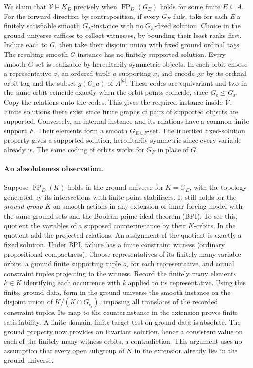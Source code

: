 \documentclass[11pt]{article}
\newcommand{\FP}{\operatorname{FP}}
\begin{document}
We claim that $\mathcal V\models K_D$ precisely when $\FP_D(G_E)$ holds for some finite $E\subseteq A$. For the forward direction by contraposition, if every $G_E$ fails, take for each $E$ a finitely satisfiable smooth $G_E$-instance with no $G_E$-fixed solution. Choice in the ground universe suffices to collect witnesses, by bounding their least ranks first. Induce each to $G$, then take their disjoint union with fixed ground ordinal tags. The resulting smooth $G$-instance has no finitely supported solution. Every smooth $G$-set is realizable by hereditarily symmetric objects. In each orbit choose a representative $x$, an ordered tuple $a$ supporting $x$, and encode $gx$ by its ordinal orbit tag and the subset $g(G_x a)$ of $A^{|a|}$. These codes are equivariant and two in the same orbit coincide exactly when the orbit points coincide, since $G_a\leq G_x$. Copy the relations onto the codes. This gives the required instance inside $\mathcal V$. Finite solutions there exist since finite graphs of pairs of supported objects are supported. Conversely, an internal instance and its relations have a common finite support $F$. Their elements form a smooth $G_{E\cup F}$-set. The inherited fixed-solution property gives a supported solution, hereditarily symmetric since every variable already is. The same coding of orbits works for $G_F$ in place of $G$.

\paragraph{An absoluteness observation.}
Suppose $\FP_D(K)$ holds in the ground universe for $K=G_E$, with the topology generated by its intersections with finite point stabilizers. It still holds for the \emph{ground group} $K$ on smooth actions in any extension or inner forcing model with the same ground sets and the Boolean prime ideal theorem (BPI). To see this, quotient the variables of a supposed counterinstance by their $K$-orbits. In the quotient add the projected relations. An assignment of the quotient is exactly a fixed solution. Under BPI, failure has a finite constraint witness (ordinary propositional compactness). Choose representatives of its finitely many variable orbits, a ground finite supporting tuple $a_i$ for each representative, and actual constraint tuples projecting to the witness. Record the finitely many elements $k\in K$ identifying each occurrence with $k$ applied to its representative. Using this finite, ground data, form in the ground universe the smooth instance on the disjoint union of $K/(K\cap G_{a_i})$, imposing all translates of the recorded constraint tuples. Its map to the counterinstance in the extension proves finite satisfiability. A finite-domain, finite-target test on ground data is absolute. The ground property now provides an invariant solution, hence a consistent value on each of the finitely many witness orbits, a contradiction. This argument uses no assumption that every open subgroup of $K$ in the extension already lies in the ground universe.
\end{document}
